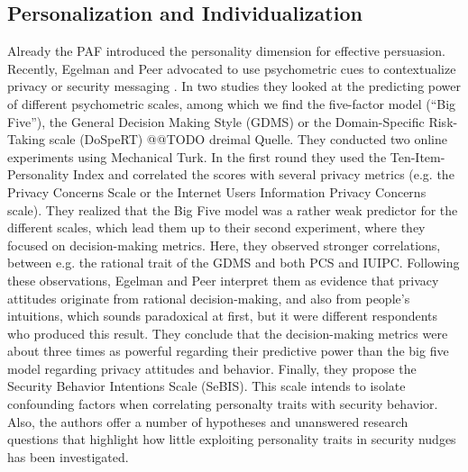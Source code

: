 \subsection{Personalization and Individualization}
Already the PAF introduced the personality dimension for effective persuasion. Recently, Egelman and Peer advocated to use psychometric cues to contextualize privacy or security messaging \cite{Egelman2015AverageUser}. In two studies they looked at the predicting power of different psychometric scales, among which we find the five-factor model (``Big Five''), the General Decision Making Style (GDMS) or the Domain-Specific Risk-Taking scale (DoSpeRT) @@TODO dreimal Quelle. They conducted two online experiments using Mechanical Turk. In the first round they used the Ten-Item-Personality Index and correlated the scores with several privacy metrics (e.g. the Privacy Concerns Scale or the Internet Users Information Privacy Concerns scale). They realized that the Big Five model was a rather weak predictor for the different scales, which lead them up to their second experiment, where they focused on decision-making metrics. Here, they observed stronger correlations, between e.g. the rational trait of the GDMS and both PCS and IUIPC. Following these observations, Egelman and Peer interpret them as evidence that privacy attitudes originate from rational decision-making, and also from people's intuitions, which sounds paradoxical at first, but it were different respondents who produced this result. They conclude that the decision-making metrics were about three times as powerful regarding their predictive power than the big five model regarding privacy attitudes and behavior. Finally, they propose the Security Behavior Intentions Scale (SeBIS). This scale intends to isolate confounding factors when correlating personalty traits with security behavior. Also, the authors offer a number of hypotheses and unanswered research questions that highlight how little exploiting personality traits in security nudges has been investigated. 


